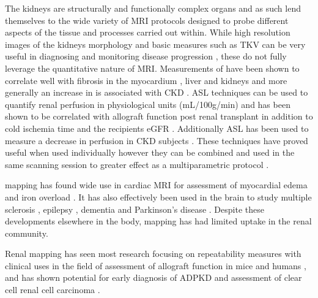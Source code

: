 The kidneys are structurally and functionally complex organs and as such lend themselves to the wide variety of MRI protocols designed to probe different aspects of the tissue and processes carried out within. While high resolution images of the kidneys morphology and basic measures such as \ac{TKV} can be very useful in diagnosing and monitoring disease progression \cite{buchanan_quantitative_2019, chapman_kidney_2012, gong_relationship_2012}, these do not fully leverage the quantitative nature of \ac{MRI}. Measurements of \tone have been shown to correlate well with fibrosis in the myocardium \cite{bull_human_2013, ferreira_t1_2013}, liver \cite{hoad_study_2015, luetkens_quantification_2018} and kidneys \cite{friedli_new_2016} and more generally an increase in \tone is associated with \ac{CKD} \cite{gillis_non-contrast_2016, cox_multiparametric_2017, buchanan_quantitative_2019}. \ac{ASL} techniques can be used to quantify renal perfusion in physiological units (mL/100g/min) and has been shown to be correlated with allograft function post renal transplant in addition to cold ischemia time and the recipients \ac{eGFR} \cite{hueper_functional_2015, artz_arterial_2011, ren_evaluation_2016, niles_longitudinal_2016}. Additionally \ac{ASL} has been used to measure a decrease in perfusion in \ac{CKD} subjects \cite{gillis_non-contrast_2016, rossi_histogram_2012, tan_renal_2014}. These techniques have proved useful when used individually however they can be combined and used in the same scanning session to greater effect as a multiparametric protocol \cite{buchanan_quantitative_2019, cox_multiparametric_2017, eckerbom_multiparametric_2019, schley_multiparametric_2018, hueper_kidney_2016}.

\ttwo mapping has found wide use in cardiac \ac{MRI} for assessment of myocardial edema \cite{gouya_rapidly_2008, giri_t2_2009, nasenstein_cardiac_2014} and iron overload \cite{guo_myocardial_2009, krittayaphong_detection_2017}. It has also effectively been used in the brain to study multiple sclerosis \cite{neema_t1-_2007}, epilepsy \cite{rugg-gunn_whole-brain_2005}, dementia \cite{knight_quantitative_2016} and Parkinson’s disease \cite{vymazal_t1_1999}. Despite these developments elsewhere in the body, \ttwo mapping has had limited uptake in the renal community.

Renal \ttwo mapping has seen most research focusing on repeatability measures \cite{de_bazelaire_mr_2004, zhang_reproducibility_2011, li_measuring_2015, de_boer_multiparametric_2020} with clinical uses in the field of assessment of allograft function in mice \cite{hueper_kidney_2016} and humans \cite{mathys_t2_2011, adams_multiparametric_2020}, and has shown potential for early diagnosis of \ac{ADPKD} \cite{franke_magnetic_2017} and assessment of clear cell renal cell carcinoma \cite{adams_use_2019}.

